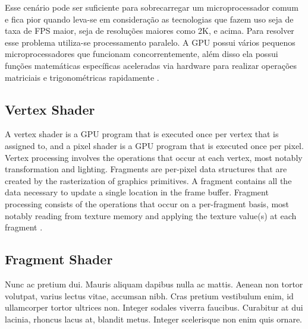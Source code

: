 Esse cenário pode ser suficiente para sobrecarregar um microprocessador comum e fica pior quando leva-se em consideração as tecnologias que fazem uso seja de taxa de FPS maior, seja de resoluções maiores como 2K, e acima. Para resolver esse problema utiliza-se processamento paralelo. A GPU possui vários pequenos microprocessadores que funcionam concorrentemente, além disso ela possui funções matemáticas específicas aceleradas via hardware para realizar operações matriciais e trigonométricas rapidamente \cite{bookOfShaders}.


\subsection{Vertex Shader}

A vertex shader is a GPU program that is executed once per vertex that is assigned to, and a pixel shader is a GPU program that is executed once per pixel.
Vertex processing involves the operations that occur at each vertex, most notably transformation and lighting. Fragments are per-pixel data structures that are created by the rasterization of graphics primitives. A fragment contains all the data necessary to update a single location in the frame buffer. Fragment processing consists of the operations that occur on a per-fragment basis, most notably reading from texture memory and applying the texture value(s) at each fragment \cite{GLSLBook}.

\subsection{Fragment Shader}





Nunc ac pretium dui. Mauris aliquam dapibus nulla ac mattis. Aenean non tortor volutpat, varius lectus vitae, accumsan nibh. Cras pretium vestibulum enim, id ullamcorper tortor ultrices non. Integer sodales viverra faucibus. Curabitur at dui lacinia, rhoncus lacus at, blandit metus. Integer scelerisque non enim quis ornare.

\lipsum[13]

